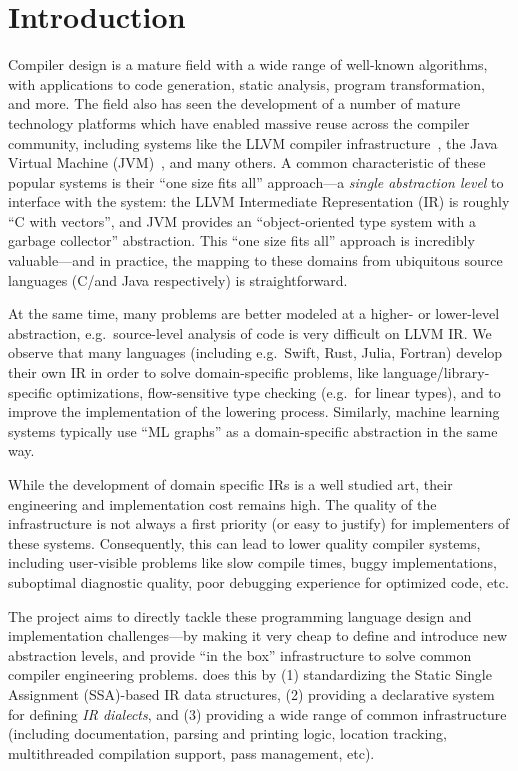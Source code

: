 \section{Introduction}\label{sec:intro}

Compiler design is a mature field with a wide range of well-known algorithms, with applications to code generation, static analysis, program transformation,
and more. The field also has seen the development of a number of mature
technology platforms which have enabled massive reuse across the compiler
community, including systems like the LLVM compiler
infrastructure~\cite{LLVM:CGO04}, the Java Virtual Machine (JVM)~\cite{Lindholm:1999:JVM:553607}, and many others.
A common characteristic of these popular systems is their ``one size fits all'' approach---a
\emph{single abstraction level} to interface with the system: the LLVM Intermediate Representation (IR) is
roughly ``C with vectors'', and JVM provides an ``object-oriented type
system with a garbage collector'' abstraction. This ``one size fits all''
approach is incredibly valuable---and in practice, the mapping to these
domains from ubiquitous source languages (C/\Cpp and Java respectively) is
straightforward.

At the same time, many problems are better modeled at a higher- or lower-level
abstraction, e.g.\ source-level analysis of \Cpp code is very difficult on LLVM
IR. We observe that many languages (including e.g.\ Swift, Rust, Julia, Fortran)
develop their own IR in order to solve domain-specific problems, like
language/library-specific optimizations, flow-sensitive type checking (e.g.\ for
linear types), and to improve the implementation of the lowering process.
Similarly, machine learning systems typically use ``ML graphs'' as a
domain-specific abstraction in the same way.

While the development of domain specific IRs is a well studied art, their
engineering and implementation cost remains high. The quality of the
infrastructure is not always a first priority (or easy to justify) for
implementers of these systems. 
Consequently, this can lead to lower quality compiler systems, including
user-visible problems like slow compile times, buggy implementations, suboptimal
diagnostic quality, poor debugging experience for optimized code, etc.

The \MLIR project aims to directly tackle these programming language design and
implementation challenges---by making it very cheap to define and introduce
new abstraction levels, and provide ``in the box'' infrastructure to solve
common compiler engineering problems. \MLIR does this by (1) standardizing the
Static Single Assignment (SSA)-based IR data structures,
(2) providing a declarative system for defining
\textit{IR dialects}, and (3) providing a wide range of common infrastructure
(including documentation, parsing and printing logic, location
tracking, multithreaded compilation support, pass management, etc).

